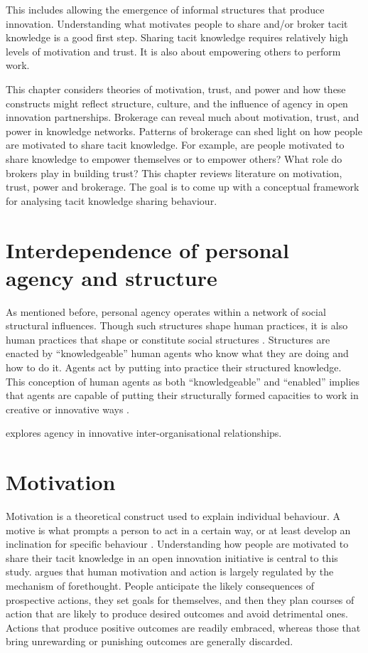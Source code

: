 This includes allowing the emergence of informal structures that produce innovation. Understanding what motivates people to share and/or broker tacit knowledge is a good first step. Sharing tacit knowledge requires relatively high levels of motivation and trust. It is also about empowering others to perform work. \medskip 

This chapter considers theories of motivation, trust, and power and how these constructs might reflect structure, culture, and the influence of agency in open innovation partnerships. Brokerage can reveal much about motivation, trust, and power in knowledge networks. Patterns of brokerage can shed light on how people are motivated to share tacit knowledge. For example, are people motivated to share knowledge to empower themselves or to empower others? What role do brokers play in building trust? This chapter reviews literature on motivation, trust, power and brokerage. The goal is to come up with a conceptual framework for analysing tacit knowledge sharing behaviour.\medskip 

\section{Interdependence of personal agency and structure}

As mentioned before, personal agency operates within a network of social structural influences. Though such structures shape human practices, it is also human practices that shape or constitute social structures \citep{sewell1992theory}. Structures are enacted by \enquote{knowledgeable} human agents who know what they are doing and how to do it. Agents act by putting into practice their structured knowledge. This conception of human agents as both \enquote{knowledgeable} and \enquote{enabled} implies that agents are capable of putting their structurally formed capacities to work in creative or innovative ways \citep{giddens1984constitution}. \medskip

\citet{davis2010agency} explores agency in innovative inter-organisational relationships.



\section{Motivation}

Motivation is a theoretical construct used to explain individual behaviour. A motive is what prompts a person to act in a certain way, or at least develop an inclination for specific behaviour \citep{pardee1990motivation}. Understanding how people are motivated to share their tacit knowledge in an open innovation initiative is central to this study. \citet{bandura1999social} argues that human motivation and action is largely regulated by the mechanism of forethought. People anticipate the likely consequences of prospective actions, they set goals for themselves, and then they plan courses of action that are likely to produce desired outcomes and avoid detrimental ones. Actions that produce positive outcomes are readily embraced, whereas those that bring unrewarding or punishing outcomes are generally discarded.


